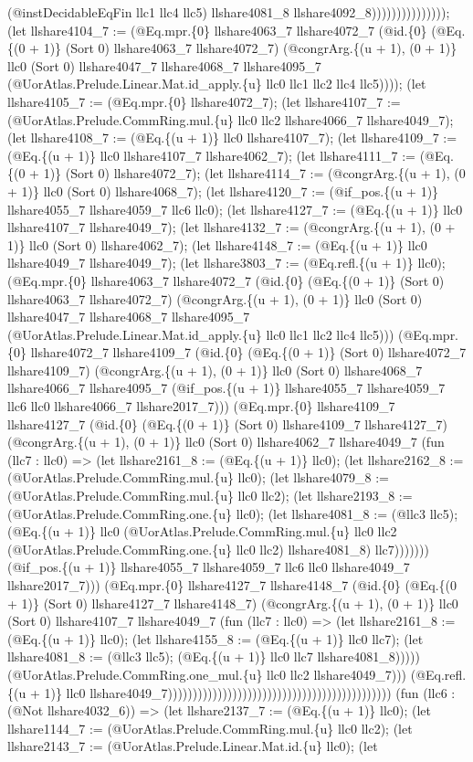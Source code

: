 \documentclass[11pt]{article}
\begin{document}
(@instDecidableEqFin llc1 llc4 llc5) llshare4081\_8 llshare4092\_8))))))))))))))); (let llshare4104\_7 := (@Eq.mpr.\{0\} llshare4063\_7 llshare4072\_7 (@id.\{0\} (@Eq.\{(0 + 1)\} (Sort 0) llshare4063\_7 llshare4072\_7) (@congrArg.\{(u + 1), (0 + 1)\} llc0 (Sort 0) llshare4047\_7 llshare4068\_7 llshare4095\_7 (@UorAtlas.Prelude.Linear.Mat.id\_apply.\{u\} llc0 llc1 llc2 llc4 llc5)))); (let llshare4105\_7 := (@Eq.mpr.\{0\} llshare4072\_7); (let llshare4107\_7 := (@UorAtlas.Prelude.CommRing.mul.\{u\} llc0 llc2 llshare4066\_7 llshare4049\_7); (let llshare4108\_7 := (@Eq.\{(u + 1)\} llc0 llshare4107\_7); (let llshare4109\_7 := (@Eq.\{(u + 1)\} llc0 llshare4107\_7 llshare4062\_7); (let llshare4111\_7 := (@Eq.\{(0 + 1)\} (Sort 0) llshare4072\_7); (let llshare4114\_7 := (@congrArg.\{(u + 1), (0 + 1)\} llc0 (Sort 0) llshare4068\_7); (let llshare4120\_7 := (@if\_pos.\{(u + 1)\} llshare4055\_7 llshare4059\_7 llc6 llc0); (let llshare4127\_7 := (@Eq.\{(u + 1)\} llc0 llshare4107\_7 llshare4049\_7); (let llshare4132\_7 := (@congrArg.\{(u + 1), (0 + 1)\} llc0 (Sort 0) llshare4062\_7); (let llshare4148\_7 := (@Eq.\{(u + 1)\} llc0 llshare4049\_7 llshare4049\_7); (let llshare3803\_7 := (@Eq.refl.\{(u + 1)\} llc0); (@Eq.mpr.\{0\} llshare4063\_7 llshare4072\_7 (@id.\{0\} (@Eq.\{(0 + 1)\} (Sort 0) llshare4063\_7 llshare4072\_7) (@congrArg.\{(u + 1), (0 + 1)\} llc0 (Sort 0) llshare4047\_7 llshare4068\_7 llshare4095\_7 (@UorAtlas.Prelude.Linear.Mat.id\_apply.\{u\} llc0 llc1 llc2 llc4 llc5))) (@Eq.mpr.\{0\} llshare4072\_7 llshare4109\_7 (@id.\{0\} (@Eq.\{(0 + 1)\} (Sort 0) llshare4072\_7 llshare4109\_7) (@congrArg.\{(u + 1), (0 + 1)\} llc0 (Sort 0) llshare4068\_7 llshare4066\_7 llshare4095\_7 (@if\_pos.\{(u + 1)\} llshare4055\_7 llshare4059\_7 llc6 llc0 llshare4066\_7 llshare2017\_7))) (@Eq.mpr.\{0\} llshare4109\_7 llshare4127\_7 (@id.\{0\} (@Eq.\{(0 + 1)\} (Sort 0) llshare4109\_7 llshare4127\_7) (@congrArg.\{(u + 1), (0 + 1)\} llc0 (Sort 0) llshare4062\_7 llshare4049\_7 (fun (llc7 : llc0) => (let llshare2161\_8 := (@Eq.\{(u + 1)\} llc0); (let llshare2162\_8 := (@UorAtlas.Prelude.CommRing.mul.\{u\} llc0); (let llshare4079\_8 := (@UorAtlas.Prelude.CommRing.mul.\{u\} llc0 llc2); (let llshare2193\_8 := (@UorAtlas.Prelude.CommRing.one.\{u\} llc0); (let llshare4081\_8 := (@llc3 llc5); (@Eq.\{(u + 1)\} llc0 (@UorAtlas.Prelude.CommRing.mul.\{u\} llc0 llc2 (@UorAtlas.Prelude.CommRing.one.\{u\} llc0 llc2) llshare4081\_8) llc7))))))) (@if\_pos.\{(u + 1)\} llshare4055\_7 llshare4059\_7 llc6 llc0 llshare4049\_7 llshare2017\_7))) (@Eq.mpr.\{0\} llshare4127\_7 llshare4148\_7 (@id.\{0\} (@Eq.\{(0 + 1)\} (Sort 0) llshare4127\_7 llshare4148\_7) (@congrArg.\{(u + 1), (0 + 1)\} llc0 (Sort 0) llshare4107\_7 llshare4049\_7 (fun (llc7 : llc0) => (let llshare2161\_8 := (@Eq.\{(u + 1)\} llc0); (let llshare4155\_8 := (@Eq.\{(u + 1)\} llc0 llc7); (let llshare4081\_8 := (@llc3 llc5); (@Eq.\{(u + 1)\} llc0 llc7 llshare4081\_8))))) (@UorAtlas.Prelude.CommRing.one\_mul.\{u\} llc0 llc2 llshare4049\_7))) (@Eq.refl.\{(u + 1)\} llc0 llshare4049\_7))))))))))))))))))))))))))))))))))))))))))))) (fun (llc6 : (@Not llshare4032\_6)) => (let llshare2137\_7 := (@Eq.\{(u + 1)\} llc0); (let llshare1144\_7 := (@UorAtlas.Prelude.CommRing.mul.\{u\} llc0 llc2); (let llshare2143\_7 := (@UorAtlas.Prelude.Linear.Mat.id.\{u\} llc0); (let 
\end{document}
